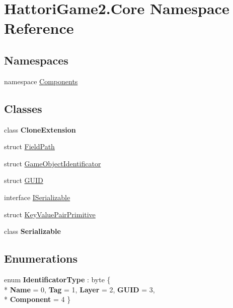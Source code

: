 \hypertarget{namespace_hattori_game2_1_1_core}{}\section{Hattori\+Game2.\+Core Namespace Reference}
\label{namespace_hattori_game2_1_1_core}
\subsection*{Namespaces}
\begin{DoxyCompactItemize}
\item 
namespace \hyperlink{namespace_hattori_game2_1_1_core_1_1_components}{Components}
\end{DoxyCompactItemize}
\subsection*{Classes}
\begin{DoxyCompactItemize}
\item 
class {\bfseries Clone\+Extension}
\item 
struct \hyperlink{struct_hattori_game2_1_1_core_1_1_field_path}{Field\+Path}
\item 
struct \hyperlink{struct_hattori_game2_1_1_core_1_1_game_object_identificator}{Game\+Object\+Identificator}
\item 
struct \hyperlink{struct_hattori_game2_1_1_core_1_1_g_u_i_d}{G\+U\+I\+D}
\item 
interface \hyperlink{interface_hattori_game2_1_1_core_1_1_i_serializable}{I\+Serializable}
\item 
struct \hyperlink{struct_hattori_game2_1_1_core_1_1_key_value_pair_primitive}{Key\+Value\+Pair\+Primitive}
\item 
class {\bfseries Serializable}
\end{DoxyCompactItemize}
\subsection*{Enumerations}
\begin{DoxyCompactItemize}
\item 
\hypertarget{namespace_hattori_game2_1_1_core_abf7a191fc08d9eb2cb48f98d25bbd908}{}enum {\bfseries Identificator\+Type} \+: byte \{ \\*
{\bfseries Name} = 0, 
{\bfseries Tag} = 1, 
{\bfseries Layer} = 2, 
{\bfseries G\+U\+I\+D} = 3, 
\\*
{\bfseries Component} = 4
 \}\label{namespace_hattori_game2_1_1_core_abf7a191fc08d9eb2cb48f98d25bbd908}

\end{DoxyCompactItemize}
